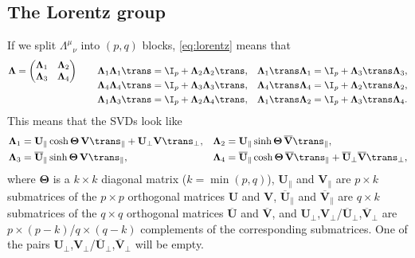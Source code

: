 \documentclass[11pt]{article}
\newcommand{\U}{\mathbf{U}}
\newcommand{\V}{\mathbf{V}}
\newcommand{\Ub}{\overline{\U}}
\newcommand{\Vb}{\overline{\V}}
\newcommand{\Lambdab}{\boldsymbol{\Lambda}}
\newcommand{\Thetab}{\boldsymbol{\Theta}}
\begin{document}

\subsection{The Lorentz group}\label{sec:group}

If we split \(\Lambda^\mu{}_\nu\) into \((p,q)\) blocks, \cref{eq:lorentz} means that
%
\begin{equation*}
  \Lambdab = 
    \begin{pmatrix}
      \Lambdab_1 & \Lambdab_2 \\
      \Lambdab_3 & \Lambdab_4
    \end{pmatrix}
  \qquad
\begin{aligned}[t]
  \Lambdab_1 \Lambdab_1\trans &= \I_p + \Lambdab_2 \Lambdab_2\trans, &
  \Lambdab_1\trans \Lambdab_1 &= \I_p + \Lambdab_3\trans \Lambdab_3, \\
  \Lambdab_4 \Lambdab_4\trans &= \I_p + \Lambdab_3 \Lambdab_3\trans, &
  \Lambdab_4\trans \Lambdab_4 &= \I_p + \Lambdab_2\trans \Lambdab_2, \\
  \Lambdab_1 \Lambdab_3\trans &= \I_p + \Lambdab_2 \Lambdab_4\trans, &
  \Lambdab_1\trans \Lambdab_2 &= \I_p + \Lambdab_3\trans \Lambdab_4.
\end{aligned}
\end{equation*}
%
This means that the SVDs look like
%
\begin{equation*}
\begin{aligned}
  \Lambdab_1  &= \U_\parallel \cosh \Thetab\, \V\trans_\parallel 
              +  \U_\perp \V\trans_\perp, &
  \Lambdab_2  &= \U_\parallel \sinh \Thetab\, \Vb\trans_\parallel, \\
  \Lambdab_3  &= \Ub_\parallel \sinh \Thetab\, \V\trans_\parallel, &
  \Lambdab_4  &= \Ub_\parallel \cosh \Thetab\, \Vb\trans_\parallel 
              +  \Ub_\perp \Vb\trans_\perp,
\end{aligned}
\end{equation*}
%
where \(\Thetab\) is a \(k \times k\) diagonal matrix (\(k = \min(p,q)\)), 
\(\U_\parallel\) and \(\V_\parallel\) are \(p \times k\) submatrices of the \(p \times p\) orthogonal matrices \(\U\) and \(\V\), 
\(\Ub_\parallel\) and \(\Vb_\parallel\) are \(q \times k\) submatrices of the \(q \times q\) orthogonal matrices \(\Ub\) and \(\Vb\), 
and \(\U_\perp\),\(\V_\perp\)/\(\Ub_\perp\),\(\Vb_\perp\) are \(p \times (p-k)\)/\(q \times (q-k)\)  complements of the corresponding submatrices.
One of the pairs \(\U_\perp\),\(\V_\perp\)/\(\Ub_\perp\),\(\Vb_\perp\) will be empty.
\end{document}
